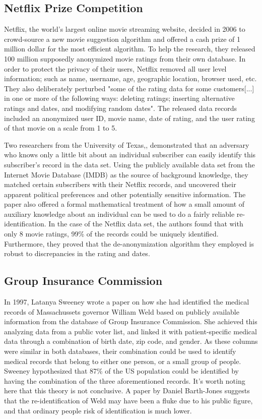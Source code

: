 \subsection{Netflix Prize Competition}
Netflix, the world's largest online movie streaming website, decided in 2006 to crowd-source a new movie suggestion algorithm and offered a cash prize of 1 million dollar for the most efficient algorithm. To help the research, they released 100 million supposedly anonymized movie ratings from their own database. In order to protect the privacy of their users, Netflix removed all user level information; such as name, username, age, geographic location, browser used, etc. They also deliberately perturbed "some of the rating data for some customers[...] in one or more of the following ways: deleting ratings; inserting alternative ratings and dates, and modifying random dates"\citep{bell2007netflix}. The released data records included an anonymized user ID, movie name, date of rating, and the user rating of that movie on a scale from 1 to 5. 

Two researchers from the University of Texas,\cite{narayanan2008robust}, demonstrated that an adversary who knows only a little bit about an individual subscriber can easily identify this subscriber's record in the data set. Using the publicly available data set from the Internet Movie Database (IMDB) as the source of background knowledge, they matched certain subscribers with their Netflix records, and uncovered their apparent political preferences and other potentially sensitive information. The paper also offered a formal mathematical treatment of how a small amount of auxiliary knowledge about an individual can be used to do a fairly reliable re-identification. In the case of the Netflix data set, the authors \citep{narayanan2008robust} found that with only 8 movie ratings, 99\% of the records could be uniquely identified. Furthermore, they proved that the de-anonymization algorithm they employed is robust to discrepancies in the rating and dates.

\subsection{Group Insurance Commission} \label{sec:GIC}
In 1997, Latanya Sweeney wrote a paper on how she had identified the medical records of Massachussets governor William Weld based on publicly available information from the database of Group Insurance Commission. She achieved this analyzing data from a public voter list, and linked it with patient-specific medical data through a combination of birth date, zip code, and gender\citep{sweeney2002k}. As these columns were similar in both databases, their combination could be used to identify medical records that belong to either one person, or a small group of people. Sweeney hypothesized that 87\% of the US population could be identified by having the combination of the three aforementioned records. It's worth noting here that this theory is not conclusive. A paper by Daniel Barth-Jones suggests that the re-identification of Weld may have been a fluke due to his public figure, and that ordinary people risk of identification is much lower\citep{barth2012re}. 

